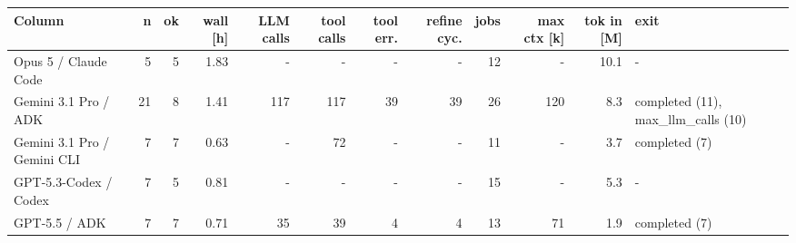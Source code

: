 \begin{tabular}{lrrrrrrrrrrl}
\toprule
Column & n & ok & wall [h] & LLM calls & tool calls & tool err. & refine cyc. & jobs & max ctx [k] & tok in [M] & exit \\
\midrule
Opus 5 / Claude Code & 5 & 5 & 1.83 & - & - & - & - & 12 & - & 10.1 & - \\
Gemini 3.1 Pro / ADK & 21 & 8 & 1.41 & 117 & 117 & 39 & 39 & 26 & 120 & 8.3 & completed (11), max\_llm\_calls (10) \\
Gemini 3.1 Pro / Gemini CLI & 7 & 7 & 0.63 & - & 72 & - & - & 11 & - & 3.7 & completed (7) \\
GPT-5.3-Codex / Codex & 7 & 5 & 0.81 & - & - & - & - & 15 & - & 5.3 & - \\
GPT-5.5 / ADK & 7 & 7 & 0.71 & 35 & 39 & 4 & 4 & 13 & 71 & 1.9 & completed (7) \\
\bottomrule
\end{tabular}

